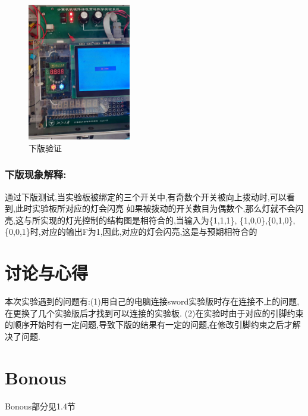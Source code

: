 \documentclass{article}
\begin{document}
	\begin{figure}[H]
	\centering
	\includegraphics[width=0.4\textwidth]{22.jpg}
	\caption{\label{Lab5}下版验证}
	\end{figure}
\subsubsection*{下版现象解释:}
通过下版测试,当实验板被绑定的三个开关中,有奇数个开关被向上拨动时,可以看到,此时实验板所对应的灯会闪亮
如果被拨动的开关数目为偶数个,那么灯就不会闪亮,这与所实现的灯光控制的结构图是相符合的,当输入为\{1,1,1\},
\{1,0,0\},\{0,1,0\},\{0,0,1\}时,对应的输出F为1,因此,对应的灯会闪亮,这是与预期相符合的





\section{讨论与心得}
本次实验遇到的问题有:(1)用自己的电脑连接sword实验版时存在连接不上的问题,在更换了几个实验版后才找到可以连接的实验板.
(2)在实验时由于对应的引脚约束的顺序开始时有一定问题,导致下版的结果有一定的问题,在修改引脚约束之后才解决了问题.


\section{Bonous}
Bonous部分见1.4节
\end{document}
